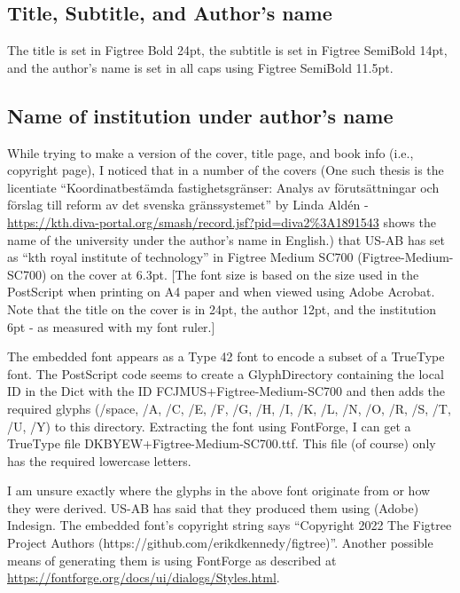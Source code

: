 \documentclass[12pt, twoside]{article}
\begin{document}
\subsection{Title, Subtitle, and Author's name}

The title is set in Figtree Bold 24pt, the subtitle is set in Figtree SemiBold 14pt, and the author's name is set in all caps using Figtree SemiBold 11.5pt.

\subsection{Name of institution under author's name}
\label{sec:cycle3NameofInstitutionOnCover}

While trying to make a version of the cover, title page, and book info (i.e., copyright page), I noticed that in a number of the covers (One such thesis is the licentiate \enquote{\foreignlanguage{swedish}{Koordinatbestämda fastighetsgränser: Analys av förutsättningar och förslag till reform av det svenska gränssystemet}} by Linda Aldén - \url{https://kth.diva-portal.org/smash/record.jsf?pid=diva2%3A1891543} shows the name of the university under the author's name in English.)  that US-AB has set as \enquote{kth royal institute of technology} in Figtree Medium SC700 (Figtree-Medium-SC700) on the cover at 6.3pt. [The font size is based on the size used in the PostScript when printing on A4 paper and when viewed using Adobe Acrobat. Note that the title on the cover is in 24pt, the author 12pt, and the institution 6pt - as measured with my font ruler.]

The embedded font appears as a Type 42 font to encode a subset of a TrueType font. The PostScript code seems to create a GlyphDirectory containing the local ID in the Dict with the ID FCJMUS+Figtree-Medium-SC700 and then adds the required glyphs (/space, /A, /C, /E, /F, /G, /H, /I, /K, /L, /N, /O, /R, /S, /T, /U, /Y) to this directory. Extracting the font using FontForge, I can get a TrueType file DKBYEW+Figtree-Medium-SC700.ttf. This file (of course) only has the required lowercase letters.

I am unsure exactly where the glyphs in the above font originate from or how they were derived. US-AB has said that they produced them using (Adobe) Indesign. The embedded font's copyright string says \enquote{Copyright 2022 The Figtree Project Authors (https://github.com/erikdkennedy/figtree)}. Another possible means of generating them is using FontForge as described at \url{https://fontforge.org/docs/ui/dialogs/Styles.html}.
\end{document}
